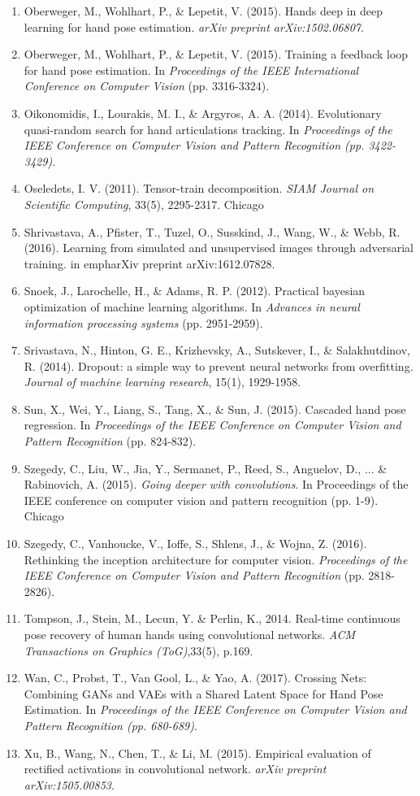 \documentclass{article}
\begin{document}
\begin{enumerate}
\item Oberweger, M., Wohlhart, P., \& Lepetit, V. (2015). Hands deep in deep learning for hand pose estimation. \emph{arXiv preprint arXiv:1502.06807}.
\item Oberweger, M., Wohlhart, P., \& Lepetit, V. (2015). Training a feedback loop for hand pose estimation. In \emph{Proceedings of the IEEE International Conference on Computer Vision} (pp. 3316-3324).
\item Oikonomidis, I., Lourakis, M. I., \& Argyros, A. A. (2014). Evolutionary quasi-random search for hand articulations tracking. In \emph{Proceedings of the IEEE Conference on Computer Vision and Pattern Recognition (pp. 3422-3429)}.
\item Oseledets, I. V. (2011). Tensor-train decomposition. \emph{SIAM Journal on Scientific Computing}, 33(5), 2295-2317.
Chicago	
\item Shrivastava, A., Pfister, T., Tuzel, O., Susskind, J., Wang, W., \& Webb, R. (2016). Learning from simulated and unsupervised images through adversarial training. in emph{arXiv preprint arXiv:1612.07828}.
\item Snoek, J., Larochelle, H., \& Adams, R. P. (2012). Practical bayesian optimization of machine learning algorithms. In \emph{Advances in neural information processing systems} (pp. 2951-2959).
\item Srivastava, N., Hinton, G. E., Krizhevsky, A., Sutskever, I., \& Salakhutdinov, R. (2014). Dropout: a simple way to prevent neural networks from overfitting. \emph{Journal of machine learning research}, 15(1), 1929-1958.
\item Sun, X., Wei, Y., Liang, S., Tang, X., \& Sun, J. (2015). Cascaded hand pose regression. In \emph{Proceedings of the IEEE Conference on Computer Vision and Pattern Recognition} (pp. 824-832).
\item Szegedy, C., Liu, W., Jia, Y., Sermanet, P., Reed, S., Anguelov, D., ... \& Rabinovich, A. (2015). \emph{Going deeper with convolutions}. In Proceedings of the IEEE conference on computer vision and pattern recognition (pp. 1-9).
Chicago
\item Szegedy, C., Vanhoucke, V., Ioffe, S., Shlens, J., \& Wojna, Z. (2016). Rethinking the inception architecture for computer vision. \emph{Proceedings of the IEEE Conference on Computer Vision and Pattern Recognition} (pp. 2818-2826).
\item Tompson, J., Stein, M., Lecun, Y. \& Perlin, K., 2014. Real-time continuous pose recovery of human hands using convolutional networks. \emph{ACM Transactions on Graphics (ToG)},33(5), p.169.
\item Wan, C., Probst, T., Van Gool, L., \& Yao, A. (2017). Crossing Nets: Combining GANs and VAEs with a Shared Latent Space for Hand Pose Estimation. In \emph{Proceedings of the IEEE Conference on Computer Vision and Pattern Recognition (pp. 680-689)}.
\item Xu, B., Wang, N., Chen, T., \& Li, M. (2015). Empirical evaluation of rectified activations in convolutional network. \emph{arXiv preprint arXiv:1505.00853}.


\end{enumerate}
\end{document}
